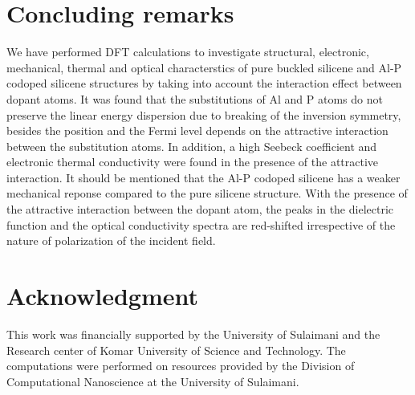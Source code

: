 \documentclass[5p,twocolumn]{elsarticle}
\begin{document}
\section{Concluding remarks}\label{Sec:Conclusion}

We have performed DFT calculations to investigate structural, electronic, mechanical, thermal and optical characterstics of pure buckled silicene and Al-P codoped silicene structures by taking into account the interaction effect between dopant atoms.
It was found that the substitutions of Al and P atoms do not preserve the linear energy dispersion due to breaking of the inversion symmetry, besides the position and the Fermi level depends on the attractive interaction between the substitution atoms. 
In addition, a high Seebeck coefficient and electronic thermal conductivity were found in the presence of the attractive interaction. It should be mentioned that the Al-P codoped silicene has a weaker mechanical reponse compared to the pure silicene structure.
With the presence of the attractive interaction between the dopant atom, the peaks in the dielectric function and the optical conductivity spectra are red-shifted irrespective of the nature of polarization of the incident field.

\section{Acknowledgment}
%
This work was financially supported by the University of Sulaimani and 
the Research center of Komar University of Science and Technology. 
The computations were performed on resources provided by the Division of Computational 
Nanoscience at the University of Sulaimani.  
 

% 
%
\end{document}
